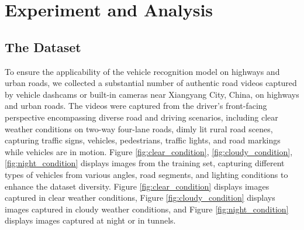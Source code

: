 \documentclass[aic]{iosart2x}
\begin{document}
\section{Experiment and Analysis} \label{sec:experiment_and_analysis}

\subsection{The Dataset}

To ensure the applicability of the vehicle recognition model on highways and urban roads, we collected a substantial number of authentic road videos captured by vehicle dashcams or built-in cameras near Xiangyang City, China, on highways and urban roads. The videos were captured from the driver's front-facing perspective encompassing diverse road and driving scenarios, including clear weather conditions on two-way four-lane roads, dimly lit rural road scenes, capturing traffic signs, vehicles, pedestrians, traffic lights, and road markings while vehicles are in motion. Figure \ref{fig:clear_condition}, \ref{fig:cloudy_condition}, \ref{fig:night_condition} displays images from the training set, capturing different types of vehicles from various angles, road segments, and lighting conditions to enhance the dataset diversity. Figure \ref{fig:clear_condition} displays images captured in clear weather conditions, Figure \ref{fig:cloudy_condition} displays images captured in cloudy weather conditions, and Figure \ref{fig:night_condition} displays images captured at night or in tunnels.
\end{document}
